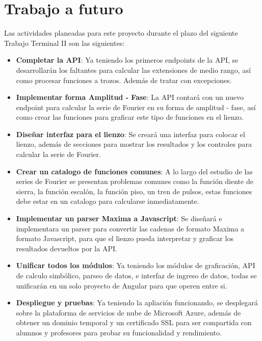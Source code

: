 \chapter{Trabajo a futuro}\label{ch:Trabajo-a-futuro}
Las actividades planeadas para este proyecto durante el plazo del siguiente Trabajo Terminal II son las siguientes:

\begin{itemize}
		\item \textbf{Completar la API}: Ya teniendo los primeros endpoints de la API, se desarrollarán los faltantes para calcular las extensiones de medio rango, así como procesar funciones a trozos. Además de tratar con excepciones.
		
		\item \textbf{Implementar forma Amplitud - Fase}: La API contará con un nuevo endpoint para calcular la serie de Fourier en su forma de amplitud - fase, así como crear las funciones para graficar este tipo de funciones en el lienzo.
		
		\item \textbf{Diseñar interfaz para el lienzo}: Se creará una interfaz para colocar el lienzo, además de secciones para mostrar los resultados y los controles para calcular la serie de Fourier.
		
		\item \textbf{Crear un catalogo de funciones comunes}: A lo largo del estudio de las series de Fourier se presentan problemas comunes como la función diente de sierra, la función escalón, la función piso, un tren de pulsos, estas funciones debe estar en un catalogo para calcularse inmediatamente.
		
		\item \textbf{Implementar un parser Maxima a Javascript}: Se diseñará e implementara un parser para convertir las cadenas de formato Maxima a formato Javascript, para que el lienzo pueda interpretar y graficar los resultados devueltos por la API.
		
		\item \textbf{Unificar todos los módulos}: Ya teniendo los módulos de graficación, API de calculo simbólico, parseo de datos, e interfaz de ingreso de datos, todas se unificarán en un solo proyecto de Angular para que operen entre si.
		
		\item \textbf{Despliegue y pruebas}: Ya teniendo la apliación funcionando, se desplegará sobre la plataforma de servicios de nube de Microsoft Azure, además de obtener un dominio temporal y un certificado SSL para ser compartida con alumnos y profesores para probar su funcionalidad y rendimiento.
\end{itemize}